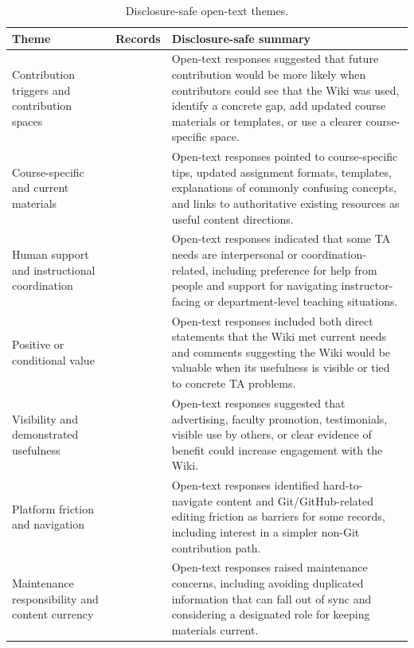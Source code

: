 \documentclass[11pt]{article}
\begin{document}
\begin{table}[H]
\centering
\renewcommand{\arraystretch}{1.08}
\footnotesize
\caption{Disclosure-safe open-text themes.}
\begin{tabular}{@{}>{\raggedright\arraybackslash}p{}@{\hspace{0.012\textwidth}}>{\raggedright\arraybackslash}p{}@{\hspace{0.012\textwidth}}>{\raggedright\arraybackslash}p{}@{}}
\toprule
Theme & Records & Disclosure-safe summary
\\
\midrule
Contribution triggers and contribution spaces & 6 & Open-text responses suggested that future contribution would be more likely when contributors could see that the Wiki was used, identify a concrete gap, add updated course materials or templates, or use a clearer course-specific space.
\\
Course-specific and current materials & 5 & Open-text responses pointed to course-specific tips, updated assignment formats, templates, explanations of commonly confusing concepts, and links to authoritative existing resources as useful content directions.
\\
Human support and instructional coordination & 5 & Open-text responses indicated that some TA needs are interpersonal or coordination-related, including preference for help from people and support for navigating instructor-facing or department-level teaching situations.
\\
Positive or conditional value & 5 & Open-text responses included both direct statements that the Wiki met current needs and comments suggesting the Wiki would be valuable when its usefulness is visible or tied to concrete TA problems.
\\
Visibility and demonstrated usefulness & 4 & Open-text responses suggested that advertising, faculty promotion, testimonials, visible use by others, or clear evidence of benefit could increase engagement with the Wiki.
\\
Platform friction and navigation & 3 & Open-text responses identified hard-to-navigate content and Git/GitHub-related editing friction as barriers for some records, including interest in a simpler non-Git contribution path.
\\
Maintenance responsibility and content currency & 2 & Open-text responses raised maintenance concerns, including avoiding duplicated information that can fall out of sync and considering a designated role for keeping materials current.
\\
\bottomrule
\end{tabular}
\normalsize
\end{table}
\end{document}
